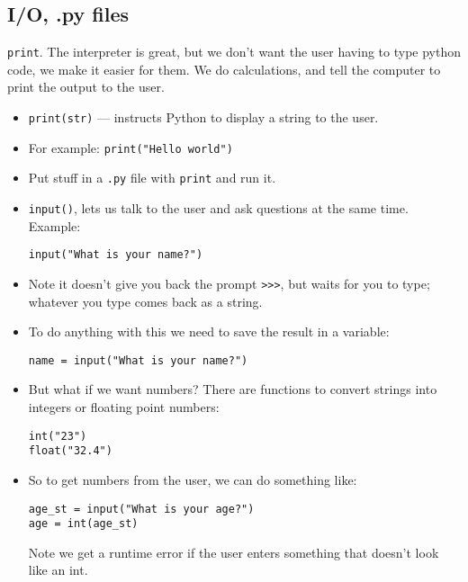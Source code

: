 \documentclass{article}
\begin{document}
\subsection*{I/O, .py files}

\verb|print|.  The interpreter is great, but we don’t want the user
having to type python code, we make it easier for them.  We do
calculations, and tell the computer to print the output to the user.

\begin{itemize}
\item \verb|print(str)| --- instructs Python to display a string to
  the user.
\item For example: \verb|print("Hello world")|

\item Put stuff in a \verb|.py| file with \verb|print| and run it.

\item \verb|input()|, lets us talk to the user and ask questions
  at the same time.  Example:
\begin{verbatim}
input("What is your name?")
\end{verbatim}
\item Note it doesn't give you back the prompt \verb|>>>|, but waits
  for you to type; whatever you type comes back as a string.

\item  To do anything with this we need to save the result in a variable:
\begin{verbatim}
name = input("What is your name?")
\end{verbatim}

\item But what if we want numbers? There are functions to convert
  strings into integers or floating point numbers:
\begin{verbatim}
int("23")
float("32.4")
\end{verbatim}

\item So to get numbers from the user, we can do something like:
\begin{verbatim}
age_st = input("What is your age?")
age = int(age_st)
\end{verbatim}

  Note we get a runtime error if the user enters something that
  doesn't look like an int.
\end{itemize}

\end{document}
